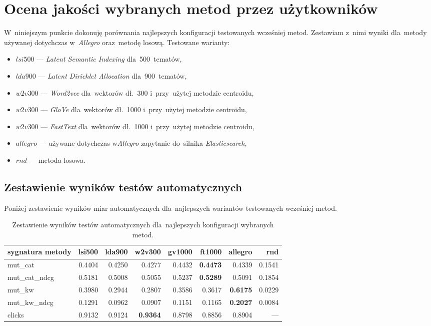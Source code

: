 \documentclass[pl]{minipw} %
\begin{document}
\section{Ocena jakości wybranych metod przez użytkowników}

W~niniejszym punkcie dokonuję porównania najlepszych konfiguracji testowanych wcześniej metod. Zestawiam z~nimi wyniki dla~metody używanej dotychczas w~\textit{Allegro} oraz~metodę losową.
Testowane warianty:
\begin{itemize}
	\item $lsi500$ --- \textit{Latent Semantic Indexing} dla~500~tematów,
	\item $lda900$ --- \textit{Latent Dirichlet Allocation} dla~900~tematów,
	\item $w2v300$ --- \textit{Word2vec} dla~wektorów dł.~300 i~przy~użytej metodzie centroidu,
	\item $w2v300$ --- \textit{GloVe} dla~wektorów dł.~1000 i~przy~użytej metodzie centroidu,
	\item $w2v300$ --- \textit{FastText} dla~wektorów dł.~1000 i~przy~użytej metodzie centroidu,
	\item $allegro$ --- używane dotychczas w\textit{Allegro} zapytanie do~silnika \textit{Elasticsearch},
	\item $rnd$ --- metoda losowa.
\end{itemize}
\subsection{Zestawienie wyników testów automatycznych}
Poniżej zestawienie wyników miar automatycznych dla~najlepszych wariantów testowanych wcześniej metod.
\begin{table}[H]
	\centering
	\begin{tabular}{lrrrrrrr}
		\hline
		sygnatura metody &   lsi500 &    lda900 &    w2v300 &   gv1000 &   ft1000 &   allegro &          rnd \\
		\hline
		mut\_cat      &   0.4404 &   0.4250  &   0.4277 &   0.4432 &   \textbf{0.4473} &    0.4339 &   0.1541 \\
		mut\_cat\_ndcg &   0.5181 &   0.5008 &   0.5055 &   0.5237 &   \textbf{0.5289} &    0.5091 &   0.1854 \\
		mut\_kw       &   0.3980  &   0.2944 &   0.2807 &   0.3586 &   0.3617 &    \textbf{0.6175} &   0.0229 \\
		mut\_kw\_ndcg  &   0.1291 &   0.0962 &   0.0907 &   0.1151 &   0.1165 &    \textbf{0.2027} &   0.0084 \\
		clicks       &   0.9132 &   0.9124 &   \textbf{0.9364} &   0.8798 &   0.8856 &    0.8904 & ---      \\
		\hline
	\end{tabular}
	\caption{Zestawienie wyników testów automatycznych dla~najlepszych konfiguracji wybranych metod.}
\end{table}
\end{document}
